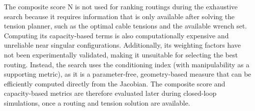 
The composite score N is not used for ranking routings during the exhaustive search because it requires information that is only available after solving the tension planner, such as the optimal cable tensions and the available wrench set. Computing its capacity-based terms is also computationally expensive and unreliable near singular configurations. Additionally, its weighting factors have not been experimentally validated, making it unsuitable for selecting the best routing. Instead, the search uses the conditioning index (with manipulability as a supporting metric), as it is a parameter-free, geometry-based measure that can be efficiently computed directly from the Jacobian. The composite score and capacity-based metrics are therefore evaluated later during closed-loop simulations, once a routing and tension solution are available.

